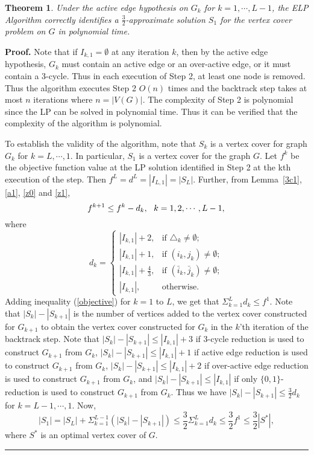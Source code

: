 \documentclass[12pt]{article}
\newtheorem{theorem}{Theorem}
\newenvironment{proof}[1][Proof]{\textbf{#1.} }{\ \rule{0.5em}{0.5em}}
\begin{document}
\vskip 5pt
\begin{theorem}
\label{conclusion} Under the active edge hypothesis on $G_k$ for $k=1, \cdots, L-1$, the ELP
Algorithm correctly identifies a $\frac 3 2$-approximate solution
$S_1$ for the vertex cover problem on $G$ in polynomial time.
\end{theorem}
\begin{proof} Note that if $I_{k,1}=\emptyset$ at any iteration $k$, then by the active edge hypothesis, $G_k$
must contain an active edge or an over-active edge, or it must contain a 3-cycle. Thus in
each execution of Step 2, at least one node is removed. Thus the
algorithm executes Step 2 $O(n)$ times and the backtrack step takes
at most $n$ iterations where $n=|V(G)|$. The complexity of Step 2 is
polynomial since the LP can be solved in polynomial time. Thus it
can be verified that
the complexity of the algorithm is polynomial.

\vskip 5pt

To establish the validity of the algorithm, note that $S_k$ is a
vertex cover for graph $G_k$ for $k=L,\cdots,1$. In particular,
$S_1$ is a vertex cover for the graph $G$. Let $f^k$ be the
objective function value at the LP solution identified in Step 2 at
the kth execution of the step. Then $f^L=d^L=|I_{L,1}|=|S_L|.$
Further, from Lemma~\ref{3c1}, \ref{a1}, \ref{z0} and \ref{z1},
\begin{equation}
\label{objective}
f^{k+1}\le f^k-d_k, \ \ k=1, 2,\cdots, L-1,\\
\end{equation}
where
\[
d_k=\left\{
\begin{array}{ll}
|I_{k,1}|+2, & \mbox {if }\triangle_k\not=\emptyset;\\
|I_{k,1}|+1, & \mbox{if }(i_{k},j_k)\neq \emptyset;\\
|I_{k,1}|+\frac{4}{3}, & \mbox{if }(\bar{i}_{k},\bar{j}_k)\neq \emptyset;\\
|I_{k,1}|, &
\mbox{otherwise}.
\end{array}  \right.
\]
Adding inequality (\ref{objective}) for  $k=1$ to $L$, we get that
\( \Sigma_{k=1}^Ld_k \le f^1. \) Note that $|S_{k}|-|S_{k+1}|$ is
the number of vertices added to the  vertex cover constructed for
$G_{k+1}$ to obtain the vertex cover constructed for $G_{k}$ in the
$k$'th iteration of the backtrack step. Note that $|S_k|-|S_{k+1}|
\leq |I_{k,1}|+3$ if 3-cycle reduction is used to construct
$G_{k+1}$ from $G_{k}$, $|S_k|-|S_{k+1}| \leq |I_{k,1}|+1$ if active
 edge reduction is used to construct $G_{k+1}$ from $G_{k}$, $|S_k|-|S_{k+1}| \leq |I_{k,1}|+2$ if over-active
 edge reduction is used to construct $G_{k+1}$ from $G_{k}$, and $|S_k|-|S_{k+1}| \leq |I_{k,1}|$
 if only $\{0,1\}$-reduction is used to construct $G_{k+1}$ from $G_k$. Thus we
have $|S_{k}|-|S_{k+1}|\le \frac 3 2 d_k$ for $k=L-1,\cdots,1.$ Now,
\[
|S_1|=|S_L|+\Sigma_{k=1}^{L-1}(|S_{k}|-|S_{k+1}|)\le\frac 3 2
\Sigma_{k=1}^Ld_k \le \frac 3 2 f^1\le \frac 3 2|S^*|,
\]
where $S^*$ is an optimal vertex cover of $G$.\end{proof}
\end{document}
